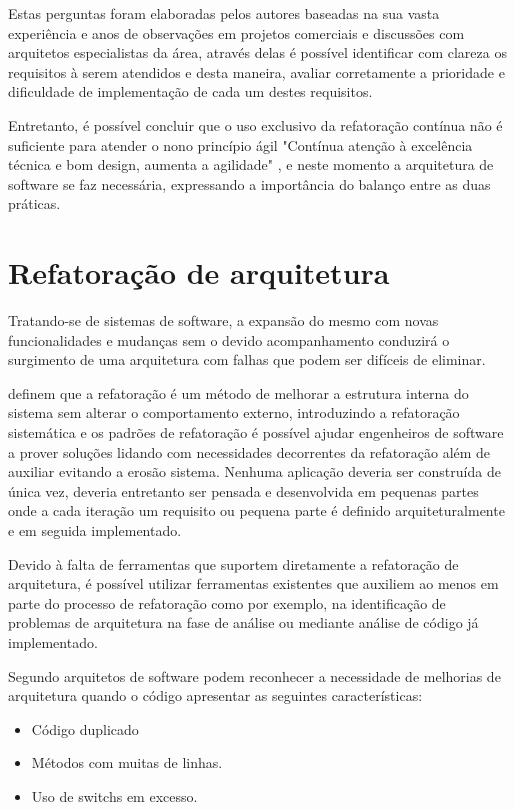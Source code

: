 Estas perguntas foram elaboradas pelos autores baseadas na sua vasta experiência e anos de observações em projetos comerciais e discussões com arquitetos especialistas da área, através delas é possível identificar com clareza os requisitos à serem atendidos e desta maneira, avaliar corretamente a prioridade e dificuldade de implementação de cada um destes requisitos.

Entretanto, é possível concluir que o uso exclusivo da refatoração contínua não é suficiente para atender o nono princípio ágil "Contínua atenção à excelência técnica e bom design, aumenta a agilidade" \cite{beck2001manifesto}, e neste momento a arquitetura de software se faz necessária, expressando a importância do balanço entre as duas práticas.


\section{Refatoração de arquitetura}

Tratando-se de sistemas de software, a expansão do mesmo com novas funcionalidades e mudanças sem o devido acompanhamento conduzirá o surgimento de uma arquitetura com falhas que podem ser difíceis de eliminar. 

\cite{babar2013agile} definem que a refatoração é um método de melhorar a estrutura interna do sistema sem alterar o comportamento externo, introduzindo a refatoração sistemática e os padrões de refatoração é possível ajudar engenheiros de software a prover soluções lidando com necessidades decorrentes da refatoração além de auxiliar evitando a erosão sistema.
Nenhuma aplicação deveria ser construída de única vez,  deveria entretanto ser pensada e desenvolvida em pequenas partes onde a cada iteração um requisito ou pequena parte é definido arquiteturalmente e em seguida implementado.

Devido à falta de ferramentas que suportem diretamente a refatoração de arquitetura, é possível utilizar ferramentas existentes que auxiliem ao menos em parte do processo de refatoração como por exemplo, na identificação de problemas de arquitetura na fase de análise ou mediante análise de código já implementado.

Segundo \cite{babar2013agile} arquitetos de software podem reconhecer a necessidade de melhorias de arquitetura quando o código apresentar as seguintes características: 
    \begin{itemize}
        \item Código duplicado
        \item Métodos com muitas de linhas.
        \item Uso de switchs em excesso.
    \end{itemize}

